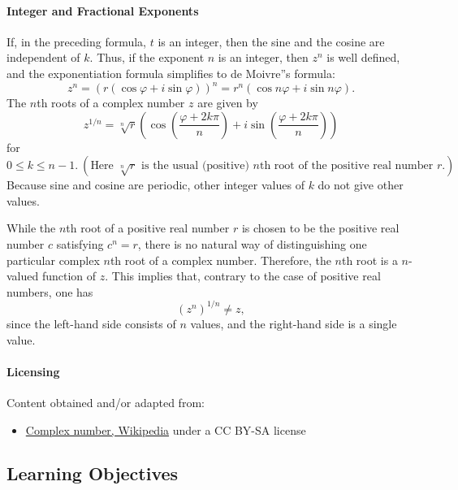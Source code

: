 \paragraph{Integer and Fractional Exponents}

If, in the preceding formula, $t$ is an integer, then the sine and the cosine are independent of $k$. Thus, if the exponent $n$ is an integer, then $z^n$ is well defined, and the exponentiation formula simplifies to de Moivre''s formula:
$$
z^n = \left(r (\cos \varphi + i \sin \varphi)\right)^n = r^n (\cos n \varphi + i \sin n \varphi).
$$
The $n$th roots of a complex number $z$ are given by
$$
z^{1/n} = \sqrt[n]{r} \left(\cos \left(\frac{\varphi + 2k\pi}{n}\right) + i \sin \left(\frac{\varphi + 2k\pi}{n}\right)\right)
$$
for $0 \leq k \leq n - 1. \ (\text{Here } \sqrt[n]{r} \text{ is the usual (positive) } n\text{th root of the positive real number } r.)$ Because sine and cosine are periodic, other integer values of $k$ do not give other values.

While the $n$th root of a positive real number $r$ is chosen to be the positive real number $c$ satisfying $c^n = r$, there is no natural way of distinguishing one particular complex $n$th root of a complex number. Therefore, the $n$th root is a $n$-valued function of $z$. This implies that, contrary to the case of positive real numbers, one has
$$
(z^n)^{1/n} \ne z,
$$
since the left-hand side consists of $n$ values, and the right-hand side is a single value.

\paragraph{Licensing}

Content obtained and/or adapted from:

\begin{itemize}
    \item \href{https://en.wikipedia.org/wiki/Complex_number}{Complex number, Wikipedia} under a CC BY-SA license
\end{itemize}

\subsection{Learning Objectives}

